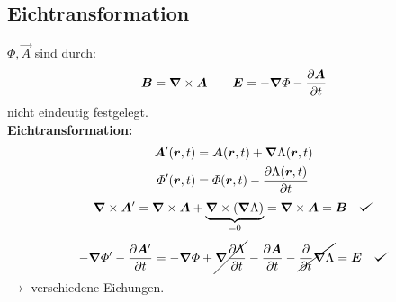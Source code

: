 \subsection{Eichtransformation}

$ \Phi, \vec{A} $ sind durch:
\begin{equation*}
\bm{B} = \bm{\nabla} \times \bm{A} \qquad \bm{E} = - \bm{\nabla} \varPhi - \frac{\partial \bm{A}}{\partial t}
\end{equation*}
nicht eindeutig festgelegt.\\[5pt]
\textbf{Eichtransformation:}
\begin{align*}
\bm{A}'(\bm{r},t) &= \bm{A}(\bm{r},t) + \bm{\nabla} \Lambda(\bm{r},t)\\
\varPhi'(\bm{r},t) &= \varPhi(\bm{r},t) - \frac{\partial \Lambda(\bm{r},t)}{\partial t}
\end{align*}
\begin{equation*}
\vabla \times \vec{A}' = \vabla \times \vec{A} + \ub{ \vabla \times (\vabla \Lambda)}_{=0} = \vabla \times \vec{A} = \vec{B} \quad \checkmark
\end{equation*}
\begin{equation*}
- \vabla \Phi' - \prt{\vec{A}'}{t} = - \vabla \Phi + \cancel{\vabla \prt{\Lambda}{t}} - \prt{\vec{A}}{t} - \cancel{\prt{}{t} \vabla \Lambda} = \vec{E} \quad \checkmark 
\end{equation*}
$ \rightarrow $ verschiedene Eichungen.
